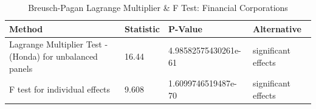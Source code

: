 \begin{table}[ht]
\centering
\caption{Breusch-Pagan Lagrange Multiplier  & F Test: Financial Corporations} 
\begingroup\small
\begin{tabular}{llll}
  \toprule
Method & Statistic & P-Value & Alternative \\ 
  \midrule
Lagrange Multiplier Test -  (Honda) for unbalanced panels & 16.44 & 4.98582575430261e-61 & significant effects \\ 
  F test for individual effects & 9.608 & 1.6099746519487e-70 & significant effects \\ 
   \bottomrule
\end{tabular}
\endgroup
\end{table}
